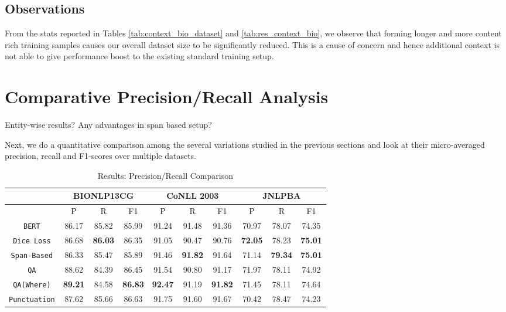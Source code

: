 \subsection{Observations}
From the stats reported in Tables \ref{tab:context_bio_dataset} and \ref{tab:res_context_bio}, we observe that forming longer and more content rich training samples causes our overall dataset size to be significantly reduced. This is a cause of concern and hence additional context is not able to give performance boost to the existing standard training setup.

\section{Comparative Precision/Recall Analysis}
\label{sec:precision_recall_analysis}

Entity-wise results? Any advantages in span based setup?

Next, we do a quantitative comparison among the several variations studied in the previous sections and look at their micro-averaged precision, recall and F1-scores over multiple datasets.

\begin{table}[h!]
\centering
\begin{tabular}{|c|c|c|c|c|c|c|c|c|c|}\hline
     & \multicolumn{3}{c|}{\textbf{BIONLP13CG}} & \multicolumn{3}{c|}{\textbf{CoNLL 2003}} & \multicolumn{3}{c|}{\textbf{JNLPBA}}\\\hline
	 & P & R & F1 & P & R & F1 & P & R & F1\\\hline
	\texttt{BERT} & 86.17 & 85.82 & 85.99 & 91.24 & 91.48 & 91.36 & 70.97 & 78.07 & 74.35\\\hline
	\texttt{Dice Loss} & 86.68 & \textbf{86.03} & 86.35 & 91.05 & 90.47 & 90.76 & \textbf{72.05} & 78.23 & \textbf{75.01}\\\hline
	\texttt{Span-Based} & 86.33 & 85.47 & 85.89 & 91.46 & \textbf{91.82} & 91.64 & 71.14 & \textbf{79.34} & \textbf{75.01}\\\hline
	\texttt{QA} & 88.62 & 84.39 & 86.45 & 91.54 & 90.80 & 91.17 & 71.97 & 78.11 & 74.92\\\hline
	\texttt{QA(Where)} & \textbf{89.21} & 84.58 & \textbf{86.83} & \textbf{92.47} & 91.19 & \textbf{91.82} & 71.45 & 78.11 & 74.64\\\hline
	\texttt{Punctuation} & 87.62 & 85.66 & 86.63 & 91.75 & 91.60 & 91.67 & 70.42 & 78.47 & 74.23\\\hline
	\end{tabular}
    \caption{Results: Precision/Recall Comparison}
    \label{tab:res_precision_recall}
\end{table}

